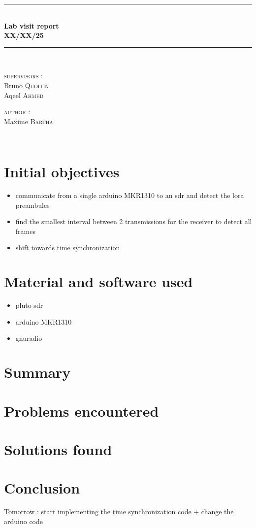 \documentclass[a4paper, 12pt]{article}
\newcommand{\HRule}{\rule{\linewidth}{0.3mm}}
\begin{document}
\begin{center}
\HRule \\[0.3cm]
{ \LARGE \bfseries Lab visit report \\[0.3cm]}
{ \LARGE \bfseries XX/XX/25 \\[0.1cm]} %
\HRule \\[1.5cm]

\begin{minipage}[t]{0.45\textwidth}
\begin{flushleft} \large
\textsc{supervisors :}\\
Bruno \textsc{Quoitin}\\
Aqeel \textsc{Ahmed}\\
\end{flushleft}

\end{minipage}
\begin{minipage}[t]{0.45\textwidth}
\begin{flushright} \large
\textsc{author :}\\
Maxime \textsc{Bartha}\\
\end{flushright}
\end{minipage}\\[2ex]
\end{center}


\section{Initial objectives}
\begin{itemize}
  \item communicate from a single arduino MKR1310 to an sdr and detect the lora preambules
  \item find the smallest interval between 2 transmissions for the receiver to detect all frames
  \item shift towards time synchronization 
\end{itemize}

\section{Material and software used}
\begin{itemize}
  \item pluto sdr
  \item arduino MKR1310
  \item gnuradio 
\end{itemize}

\section{Summary}

\section{Problems encountered} 

\section{Solutions found}

\section{Conclusion}
Tomorrow : start implementing the time synchronization code + change the arduino code 
\end{document}
